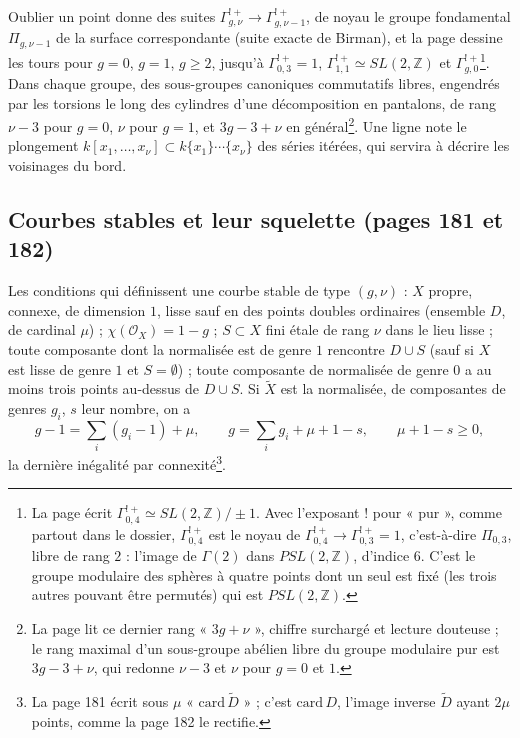 \documentclass[11pt,a4paper]{article}
\begin{document}
Oublier un point donne des suites
$\Gamma^{!+}_{g,\nu} \to \Gamma^{!+}_{g,\nu-1}$, de noyau le groupe fondamental
$\Pi_{g,\nu-1}$ de la surface correspondante (suite exacte de Birman), et la
page dessine les tours pour $g = 0$, $g = 1$, $g \geq 2$, jusqu'à
$\Gamma^{!+}_{0,3} = 1$, $\Gamma^{!+}_{1,1} \simeq SL(2, \mathbb{Z})$ et
$\Gamma^{!+}_{g,0}$\footnote{La page écrit
$\Gamma^{!+}_{0,4} \simeq SL(2, \mathbb{Z})/\pm 1$. Avec l'exposant $!$ pour
« pur », comme partout dans le dossier, $\Gamma^{!+}_{0,4}$ est le noyau de
$\Gamma^{!+}_{0,4} \to \Gamma^{!+}_{0,3} = 1$, c'est-à-dire $\Pi_{0,3}$, libre de
rang $2$ : l'image de $\Gamma(2)$ dans $PSL(2, \mathbb{Z})$, d'indice $6$. C'est
le groupe modulaire des sphères à quatre points dont un seul est fixé (les
trois autres pouvant être permutés) qui est $PSL(2, \mathbb{Z})$.}. Dans chaque groupe, des
sous-groupes canoniques commutatifs libres, engendrés par les torsions le long
des cylindres d'une décomposition en pantalons, de rang $\nu - 3$ pour $g = 0$,
$\nu$ pour $g = 1$, et $3g - 3 + \nu$ en général\footnote{La page lit ce dernier
rang « $3g + \nu$ », chiffre surchargé et lecture douteuse ; le rang maximal
d'un sous-groupe abélien libre du groupe modulaire pur est $3g - 3 + \nu$, qui
redonne $\nu - 3$ et $\nu$ pour $g = 0$ et $1$.}. Une ligne note le
plongement $k[x_1, \ldots, x_\nu] \subset k\{x_1\}\cdots\{x_\nu\}$ des séries
itérées, qui servira à décrire les voisinages du bord.

\subsection*{Courbes stables et leur squelette (pages 181 et 182)}

Les conditions qui définissent une courbe stable de type $(g, \nu)$ : $X$
propre, connexe, de dimension $1$, lisse sauf en des points doubles
ordinaires (ensemble $D$, de cardinal $\mu$) ; $\chi(\mathcal{O}_X) = 1 - g$ ;
$S \subset X$ fini étale de rang $\nu$ dans le lieu lisse ; toute composante
dont la normalisée est de genre $1$ rencontre $D \cup S$ (sauf si $X$ est
lisse de genre $1$ et $S = \emptyset$) ; toute composante de normalisée de
genre $0$ a au moins trois points au-dessus de $D \cup S$. Si
$\widetilde{X}$ est la normalisée, de composantes de genres $g_i$, $s$ leur
nombre, on a
\[
g - 1 = \sum_i (g_i - 1) + \mu, \qquad g = \sum_i g_i + \mu + 1 - s, \qquad \mu + 1 - s \geq 0,
\]
la dernière inégalité par connexité\footnote{La page 181 écrit sous $\mu$
« $\mathrm{card}\,\widetilde{D}$ » ; c'est $\mathrm{card}\,D$, l'image inverse
$\widetilde{D}$ ayant $2\mu$ points, comme la page 182 le rectifie.}.
\end{document}
